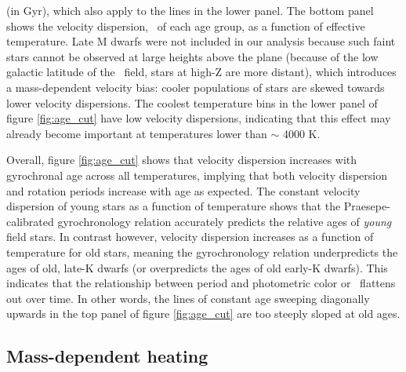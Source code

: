 (in Gyr), which also apply to the lines in the lower panel.
The bottom panel shows the velocity dispersion, \sigmavb\ of each age group,
as a function of effective temperature.
Late M dwarfs were not included in our analysis because such faint stars
cannot be observed at large heights above the plane (because of the low
galactic latitude of the \kepler\ field, stars at high-Z are more distant),
which introduces a mass-dependent velocity bias: cooler populations of stars
are skewed towards lower velocity dispersions.
The coolest temperature bins in the lower panel of figure \ref{fig:age_cut}
have low velocity dispersions, indicating that this effect may already become
important at temperatures lower than $\sim$ 4000 K.

Overall, figure \ref{fig:age_cut} shows that velocity dispersion increases
with gyrochronal age across all temperatures, implying that both velocity
dispersion and rotation periods increase with age as expected.
The constant velocity dispersion of young stars as a function of temperature
shows that the Praesepe-calibrated gyrochronology relation accurately predicts
the relative ages of {\it young} field stars.
In contrast however, velocity dispersion increases as a function of
temperature for old stars, meaning the \citet{angus2019} gyrochronology
relation underpredicts the ages of old, late-K dwarfs (or overpredicts the
ages of old early-K dwarfs).
This indicates that the relationship between period and photometric
color or \teff\ flattens out over time.
In other words, the lines of constant age sweeping diagonally upwards in the
top panel of figure \ref{fig:age_cut} are too steeply sloped at old ages.

\subsection{Mass-dependent heating}

